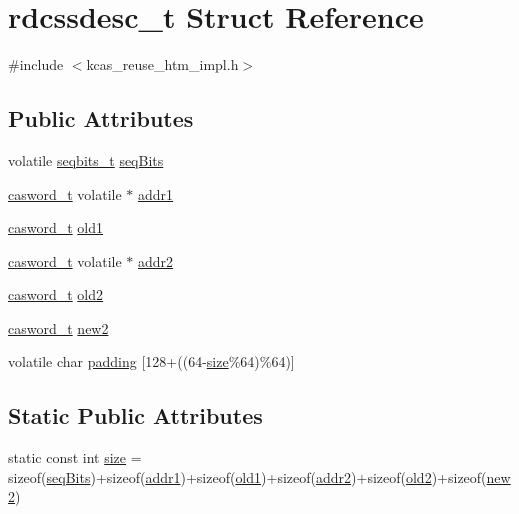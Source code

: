 \hypertarget{structrdcssdesc__t}{}\section{rdcssdesc\+\_\+t Struct Reference}
\label{structrdcssdesc__t}


{\ttfamily \#include $<$kcas\+\_\+reuse\+\_\+htm\+\_\+impl.\+h$>$}

\subsection*{Public Attributes}
\begin{DoxyCompactItemize}
\item 
volatile \hyperlink{kcas__reuse__htm__impl_8h_a997daf56279be481f5c4294647725689}{seqbits\+\_\+t} \hyperlink{structrdcssdesc__t_a1844984d511a02ef16f2a691ad991d40}{seq\+Bits}
\item 
\hyperlink{rq__unsafe_8h_ad45142aaf2ff20a036dc6242b8483e9c}{casword\+\_\+t} volatile $\ast$ \hyperlink{structrdcssdesc__t_ab47535b838f7a74d99e96738a42d204c}{addr1}
\item 
\hyperlink{rq__unsafe_8h_ad45142aaf2ff20a036dc6242b8483e9c}{casword\+\_\+t} \hyperlink{structrdcssdesc__t_a719fca618bebcab487aae8512a2b0f79}{old1}
\item 
\hyperlink{rq__unsafe_8h_ad45142aaf2ff20a036dc6242b8483e9c}{casword\+\_\+t} volatile $\ast$ \hyperlink{structrdcssdesc__t_afe6e31e7b7fea3b440994e84eba9c802}{addr2}
\item 
\hyperlink{rq__unsafe_8h_ad45142aaf2ff20a036dc6242b8483e9c}{casword\+\_\+t} \hyperlink{structrdcssdesc__t_a8e6fb7c8f1fb27020a85852b9325da38}{old2}
\item 
\hyperlink{rq__unsafe_8h_ad45142aaf2ff20a036dc6242b8483e9c}{casword\+\_\+t} \hyperlink{structrdcssdesc__t_ac49ae2fc71c98669baafb8140b84b65a}{new2}
\item 
volatile char \hyperlink{structrdcssdesc__t_afe1bb552d0d0d4618f99d44937bb3ab7}{padding} \mbox{[}128+((64-\/\hyperlink{structrdcssdesc__t_a6e3db7bcc43c398181f0647a9aedccdf}{size}\%64)\%64)\mbox{]}
\end{DoxyCompactItemize}
\subsection*{Static Public Attributes}
\begin{DoxyCompactItemize}
\item 
static const int \hyperlink{structrdcssdesc__t_a6e3db7bcc43c398181f0647a9aedccdf}{size} = sizeof(\hyperlink{structrdcssdesc__t_a1844984d511a02ef16f2a691ad991d40}{seq\+Bits})+sizeof(\hyperlink{structrdcssdesc__t_ab47535b838f7a74d99e96738a42d204c}{addr1})+sizeof(\hyperlink{structrdcssdesc__t_a719fca618bebcab487aae8512a2b0f79}{old1})+sizeof(\hyperlink{structrdcssdesc__t_afe6e31e7b7fea3b440994e84eba9c802}{addr2})+sizeof(\hyperlink{structrdcssdesc__t_a8e6fb7c8f1fb27020a85852b9325da38}{old2})+sizeof(\hyperlink{structrdcssdesc__t_ac49ae2fc71c98669baafb8140b84b65a}{new2})
\end{DoxyCompactItemize}


